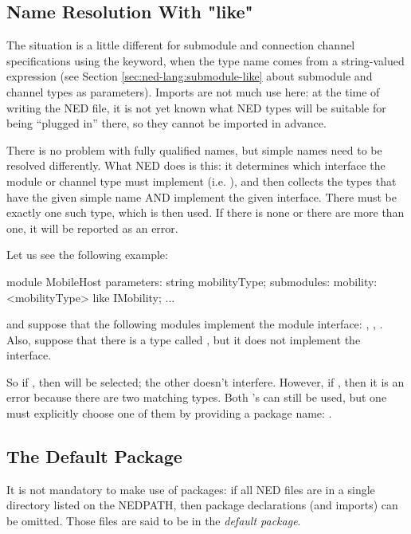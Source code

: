 \subsection{Name Resolution With "like"}
\label{sec:ned-lang:name-resolution-with-like}

The situation is a little different for submodule and connection channel
specifications using the  keyword, when the type name comes from
a string-valued expression (see Section \ref{sec:ned-lang:submodule-like} about
submodule and channel types as parameters). Imports are not much use here: at
the time of writing the NED file, it is not yet known what NED types will be
suitable for being ``plugged in'' there, so they cannot be imported in advance.

There is no problem with fully qualified names, but simple names need to be
resolved differently. What NED does is this: it determines which interface the
module or channel type must implement (i.e. ), and then
collects the types that have the given simple name AND implement the given
interface. There must be exactly one such type, which is then used. If there is
none or there are more than one, it will be reported as an error.

Let us see the following example:

\begin{ned}
module MobileHost
{
    parameters:
        string mobilityType;
    submodules:
        mobility: <mobilityType> like IMobility;
        ...
}
\end{ned}

and suppose that the following modules implement the  module
interface: , ,
. Also, suppose that there is a type called
, but it does not implement the interface.

So if , then 
will be selected; the other  doesn't interfere. However, if
, then it is an error because there are two
matching  types. Both 's can still be used, but
one must explicitly choose one of them by providing a package name:
.


\subsection{The Default Package}
\label{sec:ned-lang:default-package}

It is not mandatory to make use of packages: if all NED files are in a single
directory listed on the NEDPATH, then package declarations (and imports) can be
omitted. Those files are said to be in the \textit{default package}.






